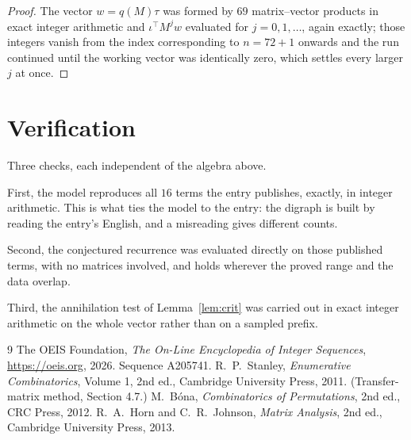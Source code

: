 \documentclass[11pt,a4paper]{article}
\theoremstyle{plain}
\theoremstyle{definition}
\begin{document}
\begin{proof}
The vector $w=q(M)\tau$ was formed by $69$ matrix--vector products in exact integer
arithmetic and $\iota^{\!\top}M^{j}w$ evaluated for $j=0,1,\dots$, again exactly; those
integers vanish from the index corresponding to $n=72+1$ onwards and the run continued
until the working vector was identically zero, which settles every larger $j$ at once.
\end{proof}

\section{Verification}

Three checks, each independent of the algebra above.

First, the model reproduces all $16$ terms the entry publishes, exactly, in integer
arithmetic. This is what ties the model to the entry: the digraph is built by reading the
entry's English, and a misreading gives different counts.

Second, the conjectured recurrence was evaluated directly on those published terms, with no
matrices involved, and holds wherever the proved range and the data overlap.

Third, the annihilation test of Lemma~\ref{lem:crit} was carried out in exact integer
arithmetic on the whole vector rather than on a sampled prefix.

\begin{thebibliography}{9}
 The OEIS Foundation, \emph{The On-Line Encyclopedia of Integer
Sequences}, \url{https://oeis.org}, 2026. Sequence A205741.
 R.~P.~Stanley, \emph{Enumerative Combinatorics}, Volume 1, 2nd ed.,
Cambridge University Press, 2011. (Transfer-matrix method, Section 4.7.)
 M.~B\'ona, \emph{Combinatorics of Permutations}, 2nd ed., CRC
Press, 2012.
 R.~A.~Horn and C.~R.~Johnson, \emph{Matrix Analysis}, 2nd ed., Cambridge
University Press, 2013.
\end{thebibliography}
\end{document}
